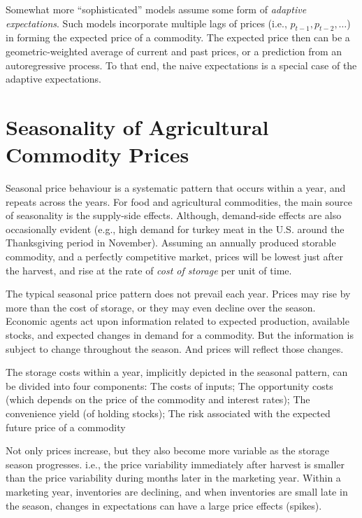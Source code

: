 \documentclass[
]{book}
\begin{document}
Somewhat more ``sophisticated'' models assume some form of \emph{adaptive expectations}. Such models incorporate multiple lags of prices (i.e., \(p_{t-1},p_{t-2},\dots\)) in forming the expected price of a commodity. The expected price then can be a geometric-weighted average of current and past prices, or a prediction from an autoregressive process. To that end, the naive expectations is a special case of the adaptive expectations.

\hypertarget{seasonality-of-agricultural-commodity-prices}{%
\section{Seasonality of Agricultural Commodity Prices}\label{seasonality-of-agricultural-commodity-prices}}

Seasonal price behaviour is a systematic pattern that occurs within a year, and repeats across the years. For food and agricultural commodities, the main source of seasonality is the supply-side effects. Although, demand-side effects are also occasionally evident (e.g., high demand for turkey meat in the U.S. around the Thanksgiving period in November). Assuming an annually produced storable commodity, and a perfectly competitive market, prices will be lowest just after the harvest, and rise at the rate of \emph{cost of storage} per unit of time.

The typical seasonal price pattern does not prevail each year. Prices may rise by more than the cost of storage, or they may even decline over the season. Economic agents act upon information related to expected production, available stocks, and expected changes in demand for a commodity. But the information is subject to change throughout the season. And prices will reflect those changes.

The storage costs within a year, implicitly depicted in the seasonal pattern, can be divided into four components: The costs of inputs; The opportunity costs (which depends on the price of the commodity and interest rates); The convenience yield (of holding stocks); The risk associated with the expected future price of a commodity

Not only prices increase, but they also become more variable as the storage season progresses. i.e., the price variability immediately after harvest is smaller than the price variability during months later in the marketing year. Within a marketing year, inventories are declining, and when inventories are small late in the season, changes in expectations can have a large price effects (spikes).
\end{document}
